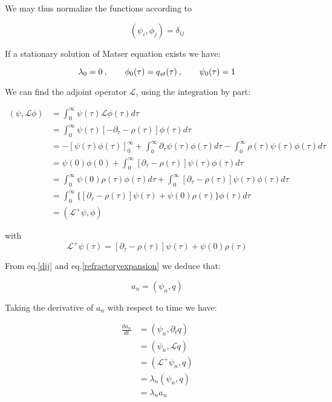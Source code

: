 \documentclass[a4paper,12pt,twoside]{article}
\def \be {\begin{equation}}
\def \ee {\end{equation}}
\begin{document}
We may thus normalize the functions according to 

\be
\label{dij}
(\psi_i,\phi_j)=\delta_{ij}
\ee

If a stationary solution of Matser equation exists we have:

\be
\lambda_0=0\:, \hspace{0.7cm} \phi_0(\tau)=q_{st}(\tau)\:,\hspace{0.7cm} \psi_0(\tau)=1
\ee

We can find the adjoint operator $\mathcal{L}$, using the integration by part:

\begin{align}
(\psi,\mathcal{L}\phi)&= \int_{0}^{\infty}\psi(\tau)\mathcal{L}\phi(\tau)d\tau  \nonumber \\
&= \int_{0}^{\infty}\psi(\tau)[-\partial_{\tau}-\rho(\tau)]\phi(\tau)d\tau  \nonumber \\
&=-[\psi(\tau)\phi(\tau)]^{\infty}_{0}+\int_{0}^{\infty}\partial_{\tau}\psi(\tau)\phi(\tau)d\tau -\int_{0}^{\infty}\rho(\tau)\psi(\tau)\phi(\tau)d\tau \nonumber \\
&= \psi(0)\phi(0)+ \int_{0}^{\infty}[\partial_{\tau}-\rho(\tau)]\psi(\tau)\phi(\tau)d\tau  \nonumber \\
&=\int_{0}^{\infty} \psi(0)\rho(\tau)\phi(\tau)d\tau+ \int_{0}^{\infty}[\partial_{\tau}-\rho(\tau)]\psi(\tau)\phi(\tau)d\tau  \nonumber \\
&= \int_{0}^{\infty}\{[\partial_{\tau}-\rho(\tau)]\psi(\tau)+ \psi(0)\rho(\tau)\}\phi(\tau)d\tau  \nonumber \\
& = (\mathcal{L}^+\psi,\phi)
\end{align}

with 
\be
\label{Ldega}
\mathcal{L}^+\psi(\tau)=[\partial_{\tau}-\rho(\tau)]\psi(\tau)+\psi(0)\rho(\tau)
\ee

From eq.\eqref{dij} and eq.\eqref{refractoryexpansion} we deduce that:

\be
\label{an}
a_n=(\psi_n,q)
\ee

Taking the derivative of $a_n$ with respect to time we have:

\begin{align}
\label{anderiv}
\frac{d a_n}{dt}&=(\psi_n,\partial_tq) \nonumber \\
&=(\psi_n,\mathcal{L}q)  \nonumber \\
&=(\mathcal{L}^+\psi_n,q) \nonumber \\
&=\lambda_n(\psi_n,q) \nonumber \\
&=\lambda_na_n
\end{align}
\end{document}
